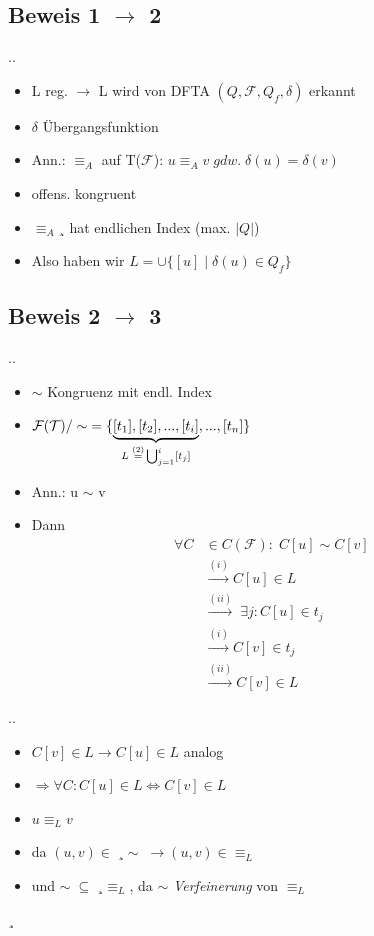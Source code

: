 \documentclass[11pt]{beamer}
\makeatletter
\newcommand*{\currentsection}{\@currentlabelname}
\makeatother
\begin{document}
\subsection{Beweis 1 $\rightarrow$ 2}
\begin{frame}{\thesection.\thesubsection. \currentsection}
\begin{itemize}
	\item L reg. $\rightarrow$ L wird von DFTA $(Q,\mathcal{F},Q_f,\delta)$ erkannt
	\item $\delta$ Übergangsfunktion
	\item Ann.: $\equiv_A$ auf T($ \mathcal{F} $): $u \equiv_A v \; gdw. \; \delta(u)=\delta(v)$
	\item offens. kongruent
	\item $\equiv_A¸$ hat endlichen Index (max. $|Q|$)
	\item Also haben wir $L = \cup \{[u] \; | \; \delta(u) \in Q_f\} $
\end{itemize}
\end{frame}

\subsection{Beweis 2 $\rightarrow$ 3}
\begin{frame}{\thesection.\thesubsection. \currentsection}
\begin{itemize}
	\item $\sim$ Kongruenz mit endl. Index
	
	\item $\mathcal{F(T)}\//\sim \; = \{\underbrace{[t_1],[t_2],...,[t_i]}_{\substack{L\;{\overset{(2)}{=}} \bigcup_{j=1}^{i} [t_j] }},...,[t_n]\}$
	\item Ann.: u $\sim$ v
	\item Dann \begin{align*}
	\forall C &\in C(\mathcal{F}): \; C[u] \sim C[v] \\
	&{\overset{(i)}{\longrightarrow}}C[u] \in L  \\
	&{\overset{(ii)}{\longrightarrow}} \; \exists j: C[u] \in t_j \\
	&{\overset{(i)}{\longrightarrow}} C[v] \in t_j \\
	&{\overset{(ii)}{\longrightarrow}} C[v] \in L
	\end{align*}
\end{itemize}
\end{frame}

\begin{frame}{\thesection.\thesubsection. \currentsection}
\begin{itemize}
	\item $ C[v] \in L \longrightarrow C[u] \in L$ analog
	\item $\Longrightarrow \forall C: C[u] \in L \Longleftrightarrow C[v] \in L$ 
	\item $u \equiv_L v $
	\item da $ (u,v) \in \;¸ \sim \; \longrightarrow (u,v) \in \equiv_L$
	\item und $\sim \; \subseteq \; ¸\equiv_L$, da $\sim$ \textit{Verfeinerung} von $\equiv_L$
\end{itemize}
¸\end{frame}
\end{document}
